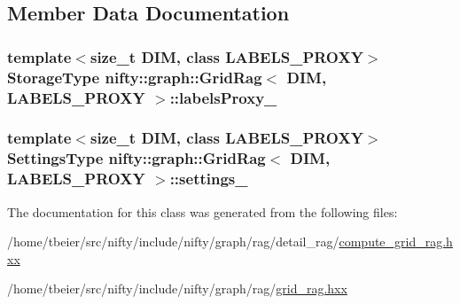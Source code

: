 \subsection{Member Data Documentation}
\hypertarget{classnifty_1_1graph_1_1GridRag_abaacb5cd2582a08e27ec4af04f5e9881}{}
\subsubsection[{labels\+Proxy\+\_\+}]{\setlength{\rightskip}{0pt plus 5cm}template$<$size\+\_\+t D\+I\+M, class L\+A\+B\+E\+L\+S\+\_\+\+P\+R\+O\+X\+Y$>$ {\bf Storage\+Type} {\bf nifty\+::graph\+::\+Grid\+Rag}$<$ D\+I\+M, L\+A\+B\+E\+L\+S\+\_\+\+P\+R\+O\+X\+Y $>$\+::labels\+Proxy\+\_\+\hspace{0.3cm}{\ttfamily [protected]}}\label{classnifty_1_1graph_1_1GridRag_abaacb5cd2582a08e27ec4af04f5e9881}
\hypertarget{classnifty_1_1graph_1_1GridRag_af4610f430b2ed52e5a4ea54c1eddcaf1}{}
\subsubsection[{settings\+\_\+}]{\setlength{\rightskip}{0pt plus 5cm}template$<$size\+\_\+t D\+I\+M, class L\+A\+B\+E\+L\+S\+\_\+\+P\+R\+O\+X\+Y$>$ {\bf Settings\+Type} {\bf nifty\+::graph\+::\+Grid\+Rag}$<$ D\+I\+M, L\+A\+B\+E\+L\+S\+\_\+\+P\+R\+O\+X\+Y $>$\+::settings\+\_\+\hspace{0.3cm}{\ttfamily [protected]}}\label{classnifty_1_1graph_1_1GridRag_af4610f430b2ed52e5a4ea54c1eddcaf1}


The documentation for this class was generated from the following files\+:\begin{DoxyCompactItemize}
\item 
/home/tbeier/src/nifty/include/nifty/graph/rag/detail\+\_\+rag/\hyperlink{compute__grid__rag_8hxx}{compute\+\_\+grid\+\_\+rag.\+hxx}\item 
/home/tbeier/src/nifty/include/nifty/graph/rag/\hyperlink{grid__rag_8hxx}{grid\+\_\+rag.\+hxx}\end{DoxyCompactItemize}
